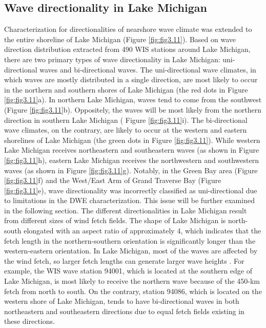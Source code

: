 \subsection{Wave directionality in Lake Michigan}
\label{Wave directionality in Lake Michigan}

Characterization for directionalities of nearshore wave climate was extended to
the entire shoreline of Lake Michigan (Figure \ref{fig:fig3.11}). Based on wave
direction distribution extracted from 490 WIS stations around Lake Michigan,
there are two primary types of wave directionality in Lake Michigan:
uni-directional waves and bi-directional waves. The uni-directional wave
climates, in which waves are mostly distributed in a single direction, are most
likely to occur in the northern and southern shores of Lake Michigan (the red
dots in Figure \ref{fig:fig3.11}a). In northern Lake Michigan, waves tend to
come from the southwest (\eg Figure \ref{fig:fig3.11}b). Oppositely, the waves
will be most likely from the northern direction in southern Lake Michigan (\eg
Figure \ref{fig:fig3.11}i). The bi-directional wave climates, on the contrary,
are likely to occur at the western and eastern shorelines of Lake Michigan (the
green dots in Figure \ref{fig:fig3.11}). While western Lake Michigan receives
northeastern and southeastern waves (as shown in Figure \ref{fig:fig3.11}h),
eastern Lake Michigan receives the northwestern and southwestern waves (as shown
in Figure \ref{fig:fig3.11}g). Notably, in the Green Bay area (Figure
\ref{fig:fig3.11}f) and the West/East Arm of Grand Traverse Bay (Figure
\ref{fig:fig3.11}e), wave directionality was incorrectly classified as
uni-directional due to limitations in the DWE characterization. This issue will
be further examined in the following section. The different directionalities in
Lake Michigan result from different sizes of wind fetch fields. The shape of
Lake Michigan is north-south elongated with an aspect ratio of approximately 4,
which indicates that the fetch length in the northern-southern orientation is
significantly longer than the western-eastern orientation. In Lake Michigan,
most of the waves are affected by the wind fetch, so larger fetch lengths can
generate larger wave heights \citep{mason_effective_2018}. For example, the WIS
wave station 94001, which is located at the southern edge of Lake Michigan, is
most likely to receive the northern wave because of the 450-km fetch from north
to south. On the contrary, station 94086, which is located on the western shore
of Lake Michigan, tends to have bi-directional waves in both northeastern and
southeastern directions due to equal fetch fields existing in these directions. 

